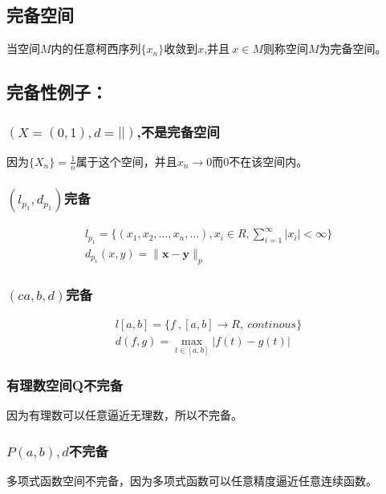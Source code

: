 \documentclass[11pt]{article}
\begin{document}
\begin{CJK*}{UTF8}{gbsn}
\subsection{完备空间}
当空间$M$内的任意柯西序列$\{x_n\} $收敛到$x$,并且$~x\in M$则称空间$M$为完备空间。
\subsection{完备性例子：}
\subsubsection{$(X=(0,1),d=||)$,不是完备空间}
因为$\{X_n\}=\frac{1}{n} $属于这个空间，并且$x_n\rightarrow 0$而$0$不在该空间内。
\subsubsection{$(l_{p_1},d_{p_1})$完备}
\begin{align*}
	l_{p_1}=\{(x_1,x_2,...,x_n,...),x_i\in R,\sum^{\infty}_{i=1}|x_i|<\infty\}\\
	d_{p_1}(x,y)=\|\bm x-\bm y\|_p
\end{align*}
\subsubsection{$(c{a,b},d)$完备}
\begin{align*}
	l[a,b]=\{f~,[a,b]\rightarrow R,~continous\}\\
	d(f,g)= \mathop{max}_{t\in [a,b]}|f(t)-g(t)|
\end{align*}
\subsubsection{有理数空间Q不完备}
因为有理数可以任意逼近无理数，所以不完备。
\subsubsection{$P(a,b),d$不完备}
多项式函数空间不完备，因为多项式函数可以任意精度逼近任意连续函数。

\end{CJK*}
\end{document}
